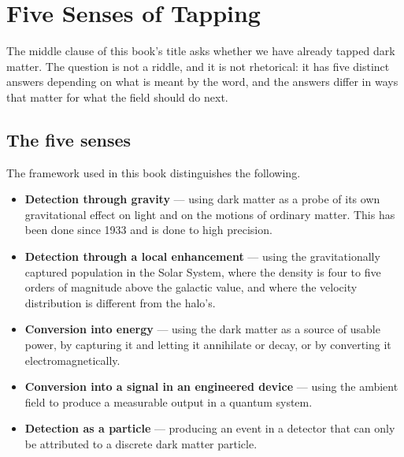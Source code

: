 
\chapter{Five Senses of Tapping}
\label{ch:senses}

The middle clause of this book's title asks whether we have already tapped
dark matter. The question is not a riddle, and it is not rhetorical: it has
five distinct answers depending on what is meant by the word, and the
answers differ in ways that matter for what the field should do next.

\section{The five senses}The framework used in this book distinguishes the
following.

\begin{itemize}
\item \textbf{Detection through gravity} --- using dark matter as a probe of
its own gravitational effect on light and on the motions of ordinary matter.
This has been done since 1933 and is done to high precision.
\item \textbf{Detection through a local enhancement} --- using the
gravitationally captured population in the Solar System, where the density
is four to five orders of magnitude above the galactic value, and where the
velocity distribution is different from the halo's.
\item \textbf{Conversion into energy} --- using the dark matter as a source
of usable power, by capturing it and letting it annihilate or decay, or by
converting it electromagnetically.
\item \textbf{Conversion into a signal in an engineered device} --- using
the ambient field to produce a measurable output in a quantum system.
\item \textbf{Detection as a particle} --- producing an event in a detector
that can only be attributed to a discrete dark matter particle.
\end{itemize}

